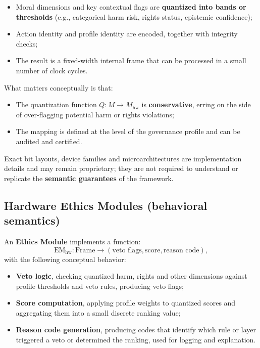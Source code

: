 \documentclass[11pt]{article}
\begin{document}
\begin{itemize}
  \item Moral dimensions and key contextual flags are \textbf{quantized into bands or thresholds} (e.g., categorical harm risk, rights status, epistemic confidence);
  \item Action identity and profile identity are encoded, together with integrity checks;
  \item The result is a fixed-width internal frame that can be processed in a small number of clock cycles.
\end{itemize}

What matters conceptually is that:

\begin{itemize}
  \item The quantization function $Q \colon M \to M_{\mathrm{hw}}$ is \textbf{conservative}, erring on the side of over-flagging potential harm or rights violations;
  \item The mapping is defined at the level of the governance profile and can be audited and certified.
\end{itemize}

Exact bit layouts, device families and microarchitectures are implementation details and may remain proprietary; they are not required to understand or replicate the \textbf{semantic guarantees} of the framework.

\subsection{Hardware Ethics Modules (behavioral semantics)}

An \textbf{Ethics Module} implements a function:
\[
  \mathrm{EM}_{\mathrm{hw}} \colon \mathrm{Frame} \to (\text{veto flags}, \text{score}, \text{reason code}),
\]
with the following conceptual behavior:

\begin{itemize}
  \item \textbf{Veto logic}, checking quantized harm, rights and other dimensions against profile thresholds and veto rules, producing veto flags;
  \item \textbf{Score computation}, applying profile weights to quantized scores and aggregating them into a small discrete ranking value;
  \item \textbf{Reason code generation}, producing codes that identify which rule or layer triggered a veto or determined the ranking, used for logging and explanation.
\end{itemize}
\end{document}
